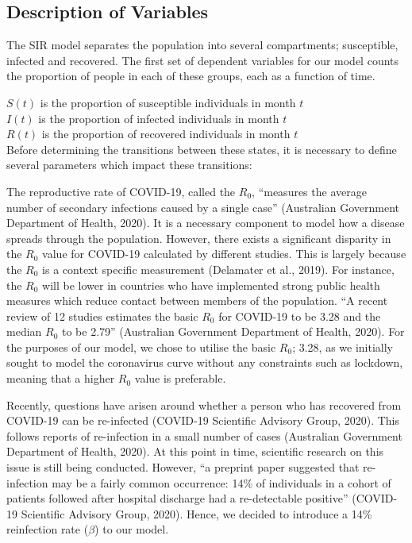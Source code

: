 \documentclass[10pt]{article}
\begin{document}
\subsection{Description of Variables}

The SIR model separates the population into several compartments; susceptible, infected and recovered. The first set of dependent variables for our model counts the proportion of people in each of these groups, each as a function of time. \newline

$S(t)$ is the proportion of susceptible individuals in month $t$
\\

$I(t)$ is the proportion of infected individuals in month $t$
\\

$R(t)$ is the proportion of recovered individuals in month $t$
\\

\noindent
Before determining the transitions between these states, it is necessary to define several parameters which impact these transitions: \newline

The reproductive rate of COVID-19, called the $R_0$, ``measures the average number of secondary infections caused by a single case'' (Australian Government Department of Health, 2020). It is a necessary component to model how a disease spreads through the population. However, there exists  a significant disparity in the $R_0$ value for COVID-19 calculated by different studies. This is largely because the $R_0$ is a context specific measurement (Delamater et al., 2019). For instance, the $R_0$ will be lower in countries who have implemented strong public health measures which reduce contact between members of the population. ``A recent review of 12 studies estimates  the basic $R_0$ for COVID-19 to be 3.28 and the median $R_0$ to be 2.79'' (Australian Government Department of Health, 2020). For the purposes of 
our model, we chose to utilise the basic $R_0$; 3.28, as we initially sought to  model the coronavirus curve without any constraints such as lockdown, meaning that a higher $R_0$ value is preferable. \newline

Recently, questions have arisen around whether a person who has recovered from COVID-19 can be re-infected (COVID-19 Scientific Advisory Group, 2020). This follows reports of re-infection in a small number of cases  (Australian Government Department of Health, 2020). At this point in time, scientific research on this issue is still being conducted. However, ``a preprint paper suggested that re-infection may be a fairly common occurrence: 14\% of individuals in a cohort of patients followed after hospital discharge had a re-detectable positive'' (COVID-19 Scientific Advisory Group, 2020). Hence, we decided to introduce a 14\% reinfection rate ($\beta$) to our model. \newline
\end{document}
